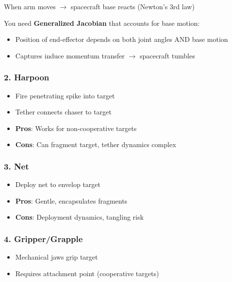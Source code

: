 \documentclass[11pt,a4paper]{article}
\begin{document}
\begin{tcolorbox}[colback=yellow!10!white,colframe=emphcolor,title=Free-Floating Dynamics]
When arm moves $\rightarrow$ spacecraft base reacts (Newton's 3rd law)

You need \textbf{Generalized Jacobian} that accounts for base motion:
\begin{itemize}[leftmargin=*]
    \item Position of end-effector depends on both joint angles AND base motion
    \item Captures induce momentum transfer $\rightarrow$ spacecraft tumbles
\end{itemize}
\end{tcolorbox}

\subsubsection{2. Harpoon}
\begin{itemize}[leftmargin=*]
    \item Fire penetrating spike into target
    \item Tether connects chaser to target
    \item \textbf{Pros}: Works for non-cooperative targets
    \item \textbf{Cons}: Can fragment target, tether dynamics complex
\end{itemize}

\subsubsection{3. Net}
\begin{itemize}[leftmargin=*]
    \item Deploy net to envelop target
    \item \textbf{Pros}: Gentle, encapsulates fragments
    \item \textbf{Cons}: Deployment dynamics, tangling risk
\end{itemize}

\subsubsection{4. Gripper/Grapple}
\begin{itemize}[leftmargin=*]
    \item Mechanical jaws grip target
    \item Requires attachment point (cooperative targets)
\end{itemize}
\end{document}
